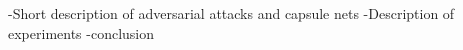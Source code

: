 \section*{}

-Short description of adversarial attacks and capsule nets
-Description of experiments
-conclusion
